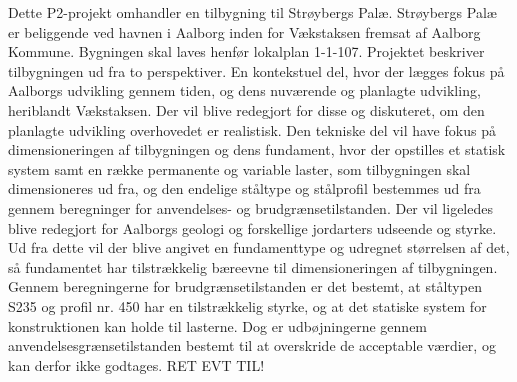 Dette P2-projekt omhandler en tilbygning til Strøybergs Palæ.
\newline
\newline
Strøybergs Palæ er beliggende ved havnen i Aalborg inden for Vækstaksen fremsat af Aalborg Kommune. Bygningen skal laves henfør lokalplan 1-1-107. Projektet beskriver tilbygningen ud fra to perspektiver. En kontekstuel del, hvor der lægges fokus på Aalborgs udvikling gennem tiden, og dens nuværende og planlagte udvikling, heriblandt Vækstaksen. Der vil blive redegjort for disse og diskuteret, om den planlagte udvikling overhovedet er realistisk. Den tekniske del vil have fokus på dimensioneringen af tilbygningen og dens fundament, hvor der opstilles et statisk system samt en række  permanente og variable laster, som tilbygningen skal dimensioneres ud fra, og den endelige ståltype og stålprofil bestemmes ud fra gennem beregninger for anvendelses- og brudgrænsetilstanden. Der vil ligeledes blive redegjort for Aalborgs geologi og forskellige jordarters udseende og styrke. Ud fra dette vil der blive angivet en fundamenttype og udregnet størrelsen af det, så fundamentet har tilstrækkelig bæreevne til dimensioneringen af tilbygningen.
\newline \indent{     }  Gennem beregningerne for brudgrænsetilstanden er det bestemt, at ståltypen S235 og profil nr. 450 har en tilstrækkelig styrke, og at det statiske system for konstruktionen kan holde til lasterne. Dog er udbøjningerne gennem anvendelsesgrænsetilstanden bestemt til at overskride de acceptable værdier, og kan derfor ikke godtages. RET EVT TIL!